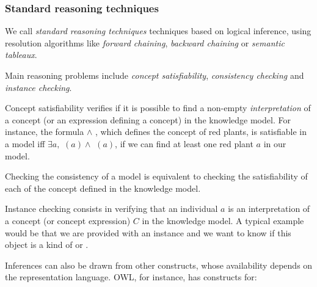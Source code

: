 \subsubsection{Standard reasoning techniques}
\label{sect|std-reasoning}

We call \emph{standard reasoning techniques} techniques based on logical
inference, using resolution algorithms like \emph{forward chaining},
\emph{backward chaining} or \emph{semantic tableaux}.

Main reasoning problems include \emph{concept satisfiability},
\emph{consistency checking} and \emph{instance checking}.

Concept satisfiability verifies if it is possible to find a non-empty
\emph{interpretation} of a concept (or an expression defining a concept) in the
knowledge model. For instance, the formula  $\land$
, which defines the concept of red plants, is satisfiable in a
model  iff $\exists a, $ $(a) \land$
$(a)$, \ie if we can find at least one red plant $a$ in our
model.

Checking the consistency of a model is equivalent to checking the
satisfiability of each of the concept defined in the knowledge model.

Instance checking consists in verifying that an individual $a$ is an
interpretation of a concept (or concept expression) $C$ in the knowledge model.
A typical example would be that we are provided with an instance
 and we want to know if this object is a kind of
 or .

Inferences can also be drawn from other constructs, whose availability depends
on the representation language. OWL, for instance, has constructs for:

